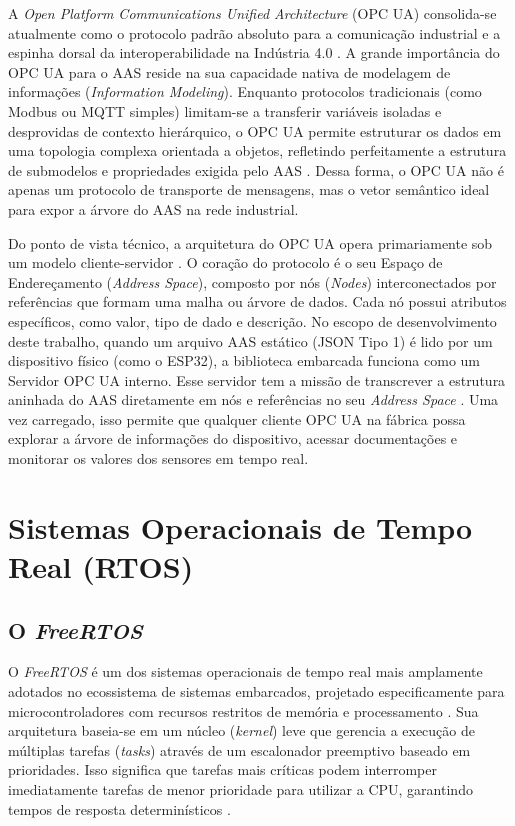 A \textit{Open Platform Communications Unified Architecture} (OPC UA) consolida-se atualmente como o protocolo padrão absoluto para a comunicação industrial e a espinha dorsal da interoperabilidade na Indústria 4.0 \cite{opcfoundation2026}. A grande importância do OPC UA para o AAS reside na sua capacidade nativa de modelagem de informações (\textit{Information Modeling}). Enquanto protocolos tradicionais (como Modbus ou MQTT simples) limitam-se a transferir variáveis isoladas e desprovidas de contexto hierárquico, o OPC UA permite estruturar os dados em uma topologia complexa orientada a objetos, refletindo perfeitamente a estrutura de submodelos e propriedades exigida pelo AAS \cite{opcfoundation2026, pribis2021}. Dessa forma, o OPC UA não é apenas um protocolo de transporte de mensagens, mas o vetor semântico ideal para expor a árvore do AAS na rede industrial.

Do ponto de vista técnico, a arquitetura do OPC UA opera primariamente sob um modelo cliente-servidor \cite{opcfoundation2026}. O coração do protocolo é o seu Espaço de Endereçamento (\textit{Address Space}), composto por nós (\textit{Nodes}) interconectados por referências que formam uma malha ou árvore de dados. Cada nó possui atributos específicos, como valor, tipo de dado e descrição. No escopo de desenvolvimento deste trabalho, quando um arquivo AAS estático (JSON Tipo 1) é lido por um dispositivo físico (como o ESP32), a biblioteca embarcada funciona como um Servidor OPC UA interno. Esse servidor tem a missão de transcrever a estrutura aninhada do AAS diretamente em nós e referências no seu \textit{Address Space} \cite{pribis2021}. Uma vez carregado, isso permite que qualquer cliente OPC UA na fábrica possa explorar a árvore de informações do dispositivo, acessar documentações e monitorar os valores dos sensores em tempo real.

\section{Sistemas Operacionais de Tempo Real (RTOS)}
\subsection{O \textit{FreeRTOS}}

O \textit{FreeRTOS} é um dos sistemas operacionais de tempo real mais amplamente adotados no ecossistema de sistemas embarcados, projetado especificamente para microcontroladores com recursos restritos de memória e processamento \cite{barry2016}. Sua arquitetura baseia-se em um núcleo (\textit{kernel}) leve que gerencia a execução de múltiplas tarefas (\textit{tasks}) através de um escalonador preemptivo baseado em prioridades. Isso significa que tarefas mais críticas podem interromper imediatamente tarefas de menor prioridade para utilizar a CPU, garantindo tempos de resposta determinísticos \cite{barry2016}.

